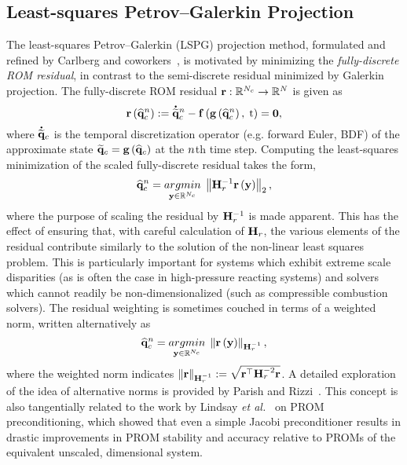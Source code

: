 \subsection{Least-squares Petrov--Galerkin Projection}

The least-squares Petrov--Galerkin (LSPG) projection method, formulated and refined by Carlberg and coworkers~\cite{Carlberg2010,Carlberg2013,Carlberg2017}, is motivated by minimizing the \textit{fully-discrete ROM residual}, in contrast to the semi-discrete residual minimized by Galerkin projection. The fully-discrete ROM residual $\mathbf{r}: \mathbb{R}^{N_c} \rightarrow \mathbb{R}^{N}$ is given as
%
\begin{equation}
    \mathbf{r}\left(\mathbf{\widehat{q}}_{c}^{n}\right) := \accentset{\mbox{\large\bfseries .}}{\mathbf{\widetilde{q}}}_{c}^{n} - \mathbf{f} \left(\mathbf{g} \left(\mathbf{\widehat{q}}_{c}^{n}\right), \; \text{t}\right) = \mathbf{0},
\end{equation}
%
where $\accentset{\mbox{\large\bfseries .}}{\mathbf{\widetilde{q}}}_{c}$ is the temporal discretization operator (e.g. forward Euler, BDF) of the approximate state $\mathbf{\widetilde{q}}_{c} = \mathbf{g} \left(\mathbf{\widehat{q}}_{c}\right)$ at the $n$th time step. Computing the least-squares minimization of the scaled fully-discrete residual takes the form,
%
\begin{equation}\label{eq:lspgLS}
    \consVecCoef^{\timeIdx} = \argmin{\dummyVec \inROne{\numConsModes}} \left\Vert \resScaleInv \resFunc{\dummyVec} \right\Vert_2,
\end{equation}
%
where the purpose of scaling the residual by $\resScaleInv$ is made apparent. This has the effect of ensuring that, with careful calculation of $\resScale$, the various elements of the residual contribute similarly to the solution of the non-linear least squares problem. This is particularly important for systems which exhibit extreme scale disparities (as is often the case in high-pressure reacting systems) and solvers which cannot readily be non-dimensionalized (such as compressible combustion solvers). The residual weighting is sometimes couched in terms of a weighted norm, written alternatively as
%
\begin{equation}
	\consVecCoef^{\timeIdx} = \argmin{\dummyVec \inROne{\numConsModes}} \left\Vert \resFunc{\dummyVec} \right\Vert_{\resScaleInv},
\end{equation}
%
where the weighted norm indicates $\Vert\resVec\Vert_{\resScaleInv} \defEq \sqrt{\resVec^\top \resScale^{-2} \resVec}$. A detailed exploration of the idea of alternative norms is provided by Parish and Rizzi~\cite{Parish2022}. This concept is also tangentially related to the work by Lindsay \textit{et al.}~\cite{Lindsay2022} on PROM preconditioning, which showed that even a simple Jacobi preconditioner results in drastic improvements in PROM stability and accuracy relative to PROMs of the equivalent unscaled, dimensional system.

